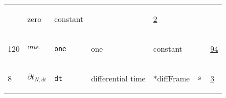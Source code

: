 \begin{longtable}{|p{1cm}|p{3cm}|p{5cm}|p{7.5cm}|p{3.0cm}|p{3cm}|p{1cm}|}
             & zero
             & \begin{lay}constant \end{lay}
             & $  $
             & \hyperlink{"e:2"}{ 2 }
                 \\
    120
             & \hypertarget{"v:120"}{ $ {one}_{} $}
             & \verb|one|
             & one
             & \begin{lay}constant \end{lay}
             & $  $
             & \hyperlink{"e:94"}{ 94 }
                 \\
    8
             & \hypertarget{"v:8"}{ $ {\partial{t}}_{N, dt} $}
             & \verb|dt|
             & differential time
             & \begin{lay}*diffFrame \end{lay}
             & $ s \, $
             & \hyperlink{"e:3"}{ 3 }
                 \\
    \end{longtable}